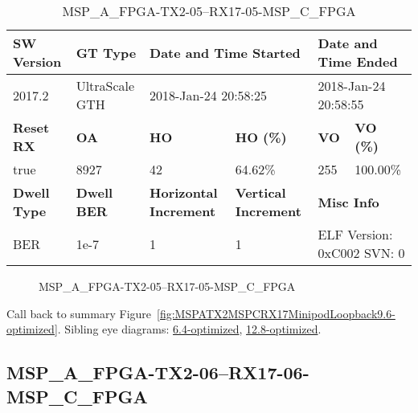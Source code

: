 \begin{table}[h]
\centering
\caption{MSP\_A\_FPGA-TX2-05--RX17-05-MSP\_C\_FPGA}
\label{tab:MSPAFPGATX205RX1705MSPCFPGA9.6-optimized}
\begin{tabular}{@{}|l|l|l|l|l|l|@{}}
\toprule
\textbf{SW Version}                & \textbf{GT Type}   & \multicolumn{2}{l|}{\textbf{Date and Time Started}}            & \multicolumn{2}{l|}{\textbf{Date and Time Ended}}        \\ \midrule
2017.2                       & UltraScale GTH          & \multicolumn{2}{l|}{2018-Jan-24 20:58:25}                   & \multicolumn{2}{l|}{2018-Jan-24 20:58:55}               \\ \midrule
\textbf{Reset RX}                  & \textbf{OA} & \textbf{HO}   & \textbf{HO (\%)} & \textbf{VO} & \textbf{VO (\%)} \\ \midrule
true & 8927        & 42          & 64.62\%        & 255        & 100.00\%       \\ \midrule
\textbf{Dwell Type}                & \textbf{Dwell BER} & \textbf{Horizontal Increment} & \textbf{Vertical Increment}    & \multicolumn{2}{l|}{\textbf{Misc Info}}                  \\ \midrule
BER                            & 1e-7        & 1        & 1           & \multicolumn{2}{l|}{ELF Version: 0xC002 SVN: 0}                         \\ \bottomrule
\end{tabular}
\end{table}

\begin{figure}[h]
\caption{MSP\_A\_FPGA-TX2-05--RX17-05-MSP\_C\_FPGA} \label{fig:MSPAFPGATX205RX1705MSPCFPGA9.6-optimized}
\end{figure}

Call back to summary Figure~\ref{fig:MSPATX2MSPCRX17MinipodLoopback9.6-optimized}.
Sibling eye diagrams: \hyperref[sec:MSPAFPGATX205RX1705MSPCFPGA6.4-optimized]{6.4-optimized}, \hyperref[sec:MSPAFPGATX205RX1705MSPCFPGA12.8-optimized]{12.8-optimized}.

\clearpage
\newpage


\subsection{MSP\_A\_FPGA-TX2-06--RX17-06-MSP\_C\_FPGA}\label{sec:MSPAFPGATX206RX1706MSPCFPGA9.6-optimized}

